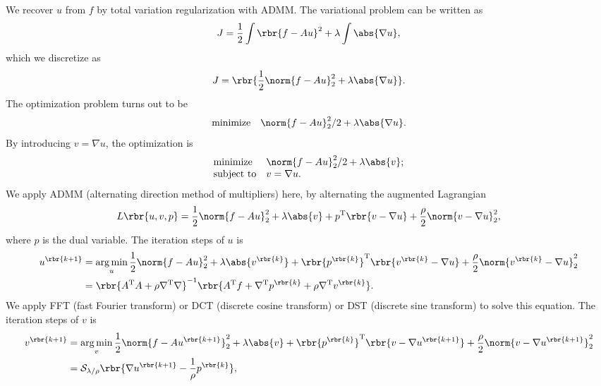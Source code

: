 \documentclass[english, nochinese]{pnote}
\begin{document}
We recover $u$ from $f$ by total variation regularization with ADMM. The variational problem can be written as
\begin{equation}
J = \frac{1}{2} \int \rbr{ f - A u }^2 + \lambda \int \abs{ \nabla u },
\end{equation}
which we discretize as
\begin{equation}
J = \rbr{ \frac{1}{2} \norm{ f - A u }_2^2 + \lambda \abs{ \nabla u } }.
\end{equation}
The optimization problem turns out to be
\begin{equation}
\begin{array}{ll}
\text{minimize} & \norm{ f - A u }_2^2 / 2 + \lambda \abs{ \nabla u }.
\end{array}
\end{equation}
By introducing $ v = \nabla u $, the optimization is
\begin{equation}
\begin{array}{ll}
\text{minimize} & \norm{ f - A u }_2^2 / 2 + \lambda \abs{v}; \\
\text{subject to} & v = \nabla u.
\end{array}
\end{equation}
We apply ADMM (alternating direction method of multipliers) here, by alternating the augmented Lagrangian
\begin{equation}
L \rbr{ u, v, p } = \frac{1}{2} \norm{ f - A u }_2^2 + \lambda \abs{v} + p^{\text{T}} \rbr{ v - \nabla u } + \frac{\rho}{2} \norm{ v - \nabla u }_2^2,
\end{equation}
where $p$ is the dual variable. The iteration steps of $u$ is
\begin{equation} \label{Eq:ItU}
\begin{split}
u^{\rbr{ k + 1 }} &= \mathop{\arg\min}_u \frac{1}{2} \norm{ f - A u }_2^2 + \lambda \abs{v^{\rbr{k}}} + \rbr{p^{\rbr{k}}}^{\text{T}} \rbr{ v^{\rbr{k}} - \nabla u } + \frac{\rho}{2} \norm{ v^{\rbr{k}} - \nabla u }_2^2 \\
&= \rbr{ A^{\text{T}} A + \rho \nabla^{\text{T}} \nabla }^{-1} \rbr{ A^{\text{T}} f + \nabla^{\text{T}} p^{\rbr{k}} + \rho \nabla^{\text{T}} v^{\rbr{k}} }.
\end{split}
\end{equation}
We apply FFT (fast Fourier transform) or DCT (discrete cosine transform) or DST (discrete sine transform) to solve this equation. The iteration steps of $v$ is
\begin{equation}
\begin{split} \label{Eq:ItV}
v^{\rbr{ k + 1 }} &= \mathop{\arg\min}_v \frac{1}{2} \norm{ f - A u^{\rbr{ k + 1 }} }_2^2 + \lambda \abs{v} + \rbr{p^{\rbr{k}}}^{\text{T}} \rbr{ v - \nabla u^{\rbr{ k + 1 }} } + \frac{\rho}{2} \norm{ v - \nabla u^{\rbr{ k + 1 }} }_2^2 \\
&= \mathcal{S}_{ \lambda / \rho } \rbr{ \nabla u^{\rbr{ k + 1 }} - \frac{1}{\rho} p^{\rbr{k}} },
\end{split}
\end{equation}
\end{document}
